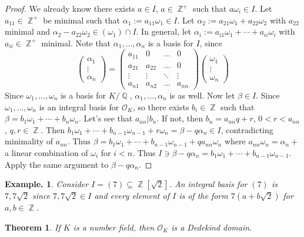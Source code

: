 \documentclass[11pt, a4paper]{memoir}
\DeclareMathOperator{\Q}{{\mathbb{Q}}}
\DeclareMathOperator{\Z}{{\mathbb{Z}}}
\theoremstyle{change}
\newtheorem{theorem}{Theorem}[section]
\theoremstyle{plain}
\theoremstyle{nonumberplain}
\newtheorem{example}{Example.}
\newtheorem{proof}{Proof}
\begin{document}
\begin{proof}
    We already know there exists $a\in I$, $a\in\Z^+$ such that $a\omega_i\in I$.
    Let $a_{11}\in\Z^+$ be minimal such that $\alpha_1:=a_{11}\omega_1\in I$.
    Let $\alpha_2:=a_{21}\omega_1+a_{22}\omega_2$ with $a_{22}$ minimal and $\alpha_2-a_{22}\omega_2\in(\omega_1)\cap I$.
    In general, let $\alpha_i:=a_{i1}\omega_1+\cdots+a_{ii}\omega_i$ with $a_{ii}\in\Z^+$ minimal.
    Note that $\alpha_1,\ldots,\alpha_n$ is a basis for $I$, since
    \begin{equation*}
        \begin{pmatrix}\alpha_1\\\vdots\\\alpha_n\end{pmatrix} = \begin{pmatrix}a_{11}&0&\hdots&0\\a_{21}&a_{22}&\hdots&0\\\vdots&\vdots&\ddots&\vdots\\a_{n1}&a_{n2}&\hdots&a_{nn}\end{pmatrix}
        \begin{pmatrix}\omega_1\\\vdots\\\omega_n\end{pmatrix}
    \end{equation*}
    Since $\omega_1,\ldots,\omega_n$ is a basis for $K/\Q$, $\alpha_1,\ldots,\alpha_n$ is as well.
    Now let $\beta\in I$.
    Since $\omega_1,\ldots,\omega_n$ is an integral basis for $\mathcal{O}_K$, so there exists $b_i\in\Z$ such that $\beta=b_1\omega_1+\cdots+b_n\omega_n$.
    Let's see that $a_{nn}|b_n$.
    If not, then $b_n=a_{nn}q+r$, $0<r<a_{nn}$, $q,r\in\Z$.
    Then $b_1\omega_1+\cdots+b_{n-1}\omega_{n-1}+r\omega_n=\beta-q\alpha_n\in I$, contradicting minimality of $a_{nn}$.
    Thus $\beta=b_1\omega_1+\cdots+b_{n-1}\omega_{n-1}+qa_{nn}\omega_n$ where $a_{nn}\omega_n=\alpha_n+$ a linear combination of $\omega_i$ for $i<n$.
    Thus $I\ni\beta-q\alpha_n=b_1\omega_1+\cdots+b_{n-1}\omega_{n-1}$.
    Apply the same argument to $\beta-q\alpha_n$.
\end{proof}
\begin{example}
    Consider $I=(7)\subseteq\Z[\sqrt{2}]$.
    An integral basis for $(7)$ is $7,7\sqrt{2}$ since $7,7\sqrt{2}\in I$ and every element of $I$ is of the form $7(a+b\sqrt{2})$ for $a,b\in\Z$.
\end{example}
\begin{theorem}
    If $K$ is a number field, then $\mathcal{O}_K$ is a Dedekind domain.
\end{theorem}
\end{document}
